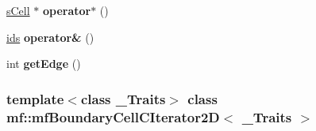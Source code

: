 \begin{DoxyCompactItemize}
\item 
\hypertarget{classmf_1_1mfBoundaryCellCIterator2D_a5f6aa7f86716791b8e723ca69bbc03a1}{
\hyperlink{classmf_1_1mfBoundaryCellCIterator2D_a0932e77a4d182a0c8a376b8ba1026e11}{sCell} $\ast$ {\bfseries operator$\ast$} ()}
\label{classmf_1_1mfBoundaryCellCIterator2D_a5f6aa7f86716791b8e723ca69bbc03a1}

\item 
\hypertarget{classmf_1_1mfBoundaryCellCIterator2D_aeb7e2b342eba8ed848a8579f2d529616}{
\hyperlink{classmf_1_1mfBoundaryCellCIterator2D_a7b3c67238a3b4186e08f6fa05c11db31}{ids} {\bfseries operator\&} ()}
\label{classmf_1_1mfBoundaryCellCIterator2D_aeb7e2b342eba8ed848a8579f2d529616}

\item 
\hypertarget{classmf_1_1mfBoundaryCellCIterator2D_a775d40179222a9f2764893c5843df0ad}{
int {\bfseries getEdge} ()}
\label{classmf_1_1mfBoundaryCellCIterator2D_a775d40179222a9f2764893c5843df0ad}

\end{DoxyCompactItemize}
\subsubsection*{template$<$class \_\-Traits$>$ class mf::mfBoundaryCellCIterator2D$<$ \_\-Traits $>$}



